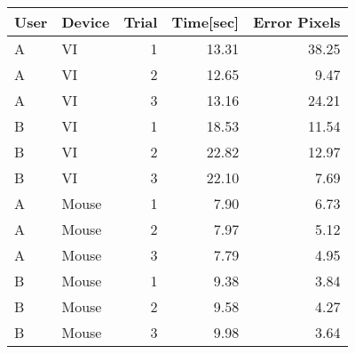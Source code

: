 \begin{tabular}{llrrr}
 \toprule
 User & Device & Trial & Time[sec] & Error Pixels \\
 \midrule
 A	& VI	  & 1	& 13.31	& 38.25  \\
 A	& VI	  & 2	& 12.65	& 9.47 \\
 A	& VI	  & 3	& 13.16	& 24.21 \\
 B	& VI	  & 1	& 18.53	& 11.54 \\
 B	& VI	  & 2	& 22.82	& 12.97 \\
 B	& VI	  & 3	& 22.10	& 7.69 \\
 A	& Mouse	& 1	& 7.90	& 6.73 \\
 A	& Mouse	& 2	& 7.97	& 5.12 \\
 A	& Mouse	& 3	& 7.79	& 4.95 \\
 B	& Mouse	& 1	& 9.38	& 3.84 \\
 B	& Mouse	& 2	& 9.58	& 4.27 \\
 B	& Mouse	& 3	& 9.98	& 3.64 \\
 \bottomrule
\end{tabular}
